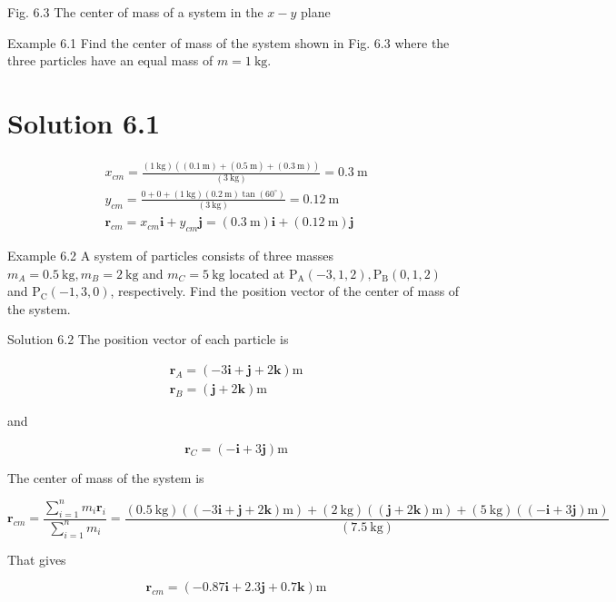\documentclass[10pt]{article}
\begin{document}
Fig. 6.3 The center of mass of a system in the $x-y$ plane

Example 6.1 Find the center of mass of the system shown in Fig. 6.3 where the three particles have an equal mass of $m=1 \mathrm{~kg}$.

\section*{Solution 6.1}
$$
\begin{gathered}
x_{c m}=\frac{(1 \mathrm{~kg})((0.1 \mathrm{~m})+(0.5 \mathrm{~m})+(0.3 \mathrm{~m}))}{(3 \mathrm{~kg})}=0.3 \mathrm{~m} \\
y_{c m}=\frac{0+0+(1 \mathrm{~kg})(0.2 \mathrm{~m}) \tan \left(60^{\circ}\right)}{(3 \mathrm{~kg})}=0.12 \mathrm{~m} \\
\mathbf{r}_{c m}=x_{c m} \mathbf{i}+y_{c m} \mathbf{j}=(0.3 \mathrm{~m}) \mathbf{i}+(0.12 \mathrm{~m}) \mathbf{j}
\end{gathered}
$$

Example 6.2 A system of particles consists of three masses $m_{A}=0.5 \mathrm{~kg}, m_{B}=2 \mathrm{~kg}$ and $m_{C}=5 \mathrm{~kg}$ located at $\mathrm{P}_{\mathrm{A}}(-3,1,2), \mathrm{P}_{\mathrm{B}}(0,1,2)$ and $\mathrm{P}_{\mathrm{C}}(-1,3,0)$, respectively. Find the position vector of the center of mass of the system.

Solution 6.2 The position vector of each particle is

$$
\begin{gathered}
\mathbf{r}_{A}=(-3 \mathbf{i}+\mathbf{j}+2 \mathbf{k}) \mathrm{m} \\
\mathbf{r}_{B}=(\mathbf{j}+2 \mathbf{k}) \mathrm{m}
\end{gathered}
$$

and

$$
\mathbf{r}_{C}=(-\mathbf{i}+3 \mathbf{j}) \mathrm{m}
$$

The center of mass of the system is

$$
\mathbf{r}_{c m}=\frac{\sum_{i=1}^{n} m_{i} \mathbf{r}_{i}}{\sum_{i=1}^{n} m_{i}}=\frac{(0.5 \mathrm{~kg})((-3 \mathbf{i}+\mathbf{j}+2 \mathbf{k}) \mathrm{m})+(2 \mathrm{~kg})((\mathbf{j}+2 \mathbf{k}) \mathrm{m})+(5 \mathrm{~kg})((-\mathbf{i}+3 \mathbf{j}) \mathrm{m})}{(7.5 \mathrm{~kg})}
$$

That gives

$$
\mathbf{r}_{c m}=(-0.87 \mathbf{i}+2.3 \mathbf{j}+0.7 \mathbf{k}) \mathrm{m}
$$
\end{document}
